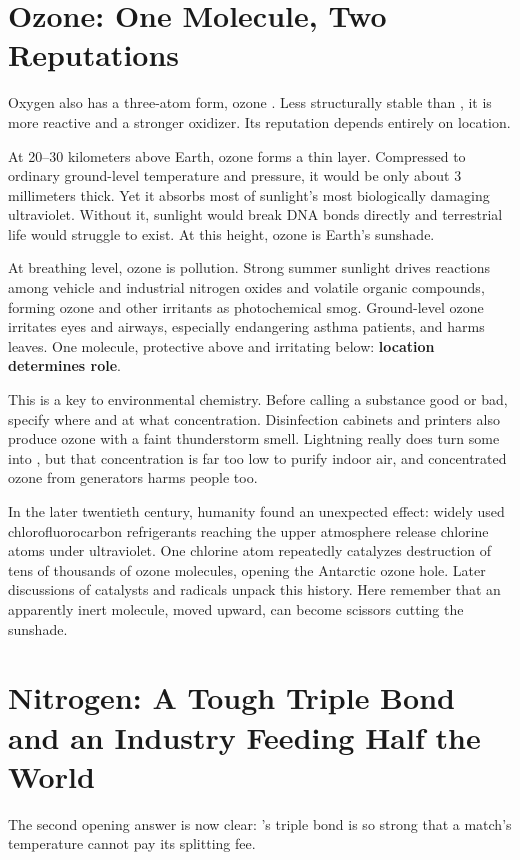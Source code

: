 \section{Ozone: One Molecule, Two Reputations}

Oxygen also has a three-atom form, ozone . Less structurally stable than , it is more reactive and a stronger oxidizer. Its reputation depends entirely on location.

At 20--30 kilometers above Earth, ozone forms a thin layer. Compressed to ordinary ground-level temperature and pressure, it would be only about 3 millimeters thick. Yet it absorbs most of sunlight's most biologically damaging ultraviolet. Without it, sunlight would break DNA bonds directly and terrestrial life would struggle to exist. At this height, ozone is Earth's sunshade.

At breathing level, ozone is pollution. Strong summer sunlight drives reactions among vehicle and industrial nitrogen oxides and volatile organic compounds, forming ozone and other irritants as photochemical smog. Ground-level ozone irritates eyes and airways, especially endangering asthma patients, and harms leaves. One molecule, protective above and irritating below: \textbf{location determines role}.

This is a key to environmental chemistry. Before calling a substance good or bad, specify where and at what concentration. Disinfection cabinets and printers also produce ozone with a faint thunderstorm smell. Lightning really does turn some  into , but that concentration is far too low to purify indoor air, and concentrated ozone from generators harms people too.

In the later twentieth century, humanity found an unexpected effect: widely used chlorofluorocarbon refrigerants reaching the upper atmosphere release chlorine atoms under ultraviolet. One chlorine atom repeatedly catalyzes destruction of tens of thousands of ozone molecules, opening the Antarctic ozone hole. Later discussions of catalysts and radicals unpack this history. Here remember that an apparently inert molecule, moved upward, can become scissors cutting the sunshade.

\section{Nitrogen: A Tough Triple Bond and an Industry Feeding Half the World}

The second opening answer is now clear: 's triple bond is so strong that a match's temperature cannot pay its splitting fee.

